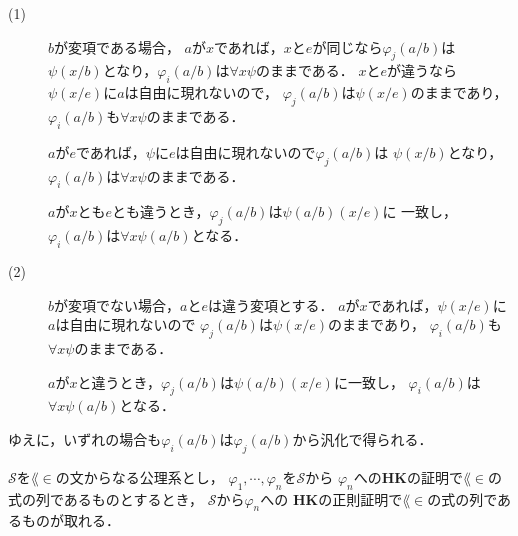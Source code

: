\begin{metaprf}
\begin{description}
				\begin{description}
					\item[(1)] $b$が変項である場合，
						$a$が$x$であれば，$x$と$e$が同じなら$\varphi_{j}(a/b)$は
						$\psi(x/b)$となり，$\varphi_{i}(a/b)$は$\forall x \psi$のままである．
						$x$と$e$が違うなら$\psi(x/e)$に$a$は自由に現れないので，
						$\varphi_{j}(a/b)$は$\psi(x/e)$のままであり，
						$\varphi_{i}(a/b)$も$\forall x \psi$のままである．
						
						$a$が$e$であれば，$\psi$に$e$は自由に現れないので$\varphi_{j}(a/b)$は
						$\psi(x/b)$となり，$\varphi_{i}(a/b)$は$\forall x \psi$のままである．
				
						$a$が$x$とも$e$とも違うとき，$\varphi_{j}(a/b)$は$\psi(a/b)(x/e)$に
						一致し，$\varphi_{i}(a/b)$は$\forall x \psi(a/b)$となる．
						
					\item[(2)] $b$が変項でない場合，$a$と$e$は違う変項とする．
						$a$が$x$であれば，$\psi(x/e)$に$a$は自由に現れないので
						$\varphi_{j}(a/b)$は$\psi(x/e)$のままであり，
						$\varphi_{i}(a/b)$も$\forall x \psi$のままである．
				
						$a$が$x$と違うとき，$\varphi_{j}(a/b)$は$\psi(a/b)(x/e)$に一致し，
						$\varphi_{i}(a/b)$は$\forall x \psi(a/b)$となる．
				\end{description}
				
				ゆえに，いずれの場合も$\varphi_{i}(a/b)$は$\varphi_{j}(a/b)$から汎化で得られる．
				\QED
		\end{description}
	\end{metaprf}
	
	\begin{screen}
		\begin{metathm}[どんな証明も正則化できる]
		\label{metathm:regularization_of_HK_proof}
			$\mathscr{S}$を$\lang{\in}$の文からなる公理系とし，
			$\varphi_{1},\cdots,\varphi_{n}$を$\mathscr{S}$から
			$\varphi_{n}$への{\bf HK}の証明で$\lang{\in}$の式の列であるものとするとき，
			$\mathscr{S}$から$\varphi_{n}$への
			{\bf HK}の正則証明で$\lang{\in}$の式の列であるものが取れる．
		\end{metathm}
	\end{screen}
	

